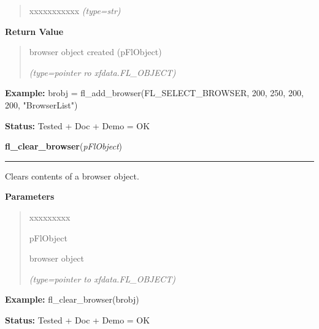 \begin{boxedminipage}{\funcwidth}
\begin{quote}
\begin{Ventry}{xxxxxxxxxxx}
            {\it (type=str)}

        \end{Ventry}

      \end{quote}

      \textbf{Return Value}
    \vspace{-1ex}

      \begin{quote}
      browser object created (pFlObject)

      {\it (type=pointer ro xfdata.FL\_OBJECT)}

      \end{quote}

\textbf{Example:} brobj = fl\_add\_browser(FL\_SELECT\_BROWSER, 200, 250, 200, 200,         
"BrowserList")



\textbf{Status:} Tested + Doc + Demo = OK



    \end{boxedminipage}

    \label{xformslib:flbrowser:fl_clear_browser}

    \vspace{0.5ex}

\hspace{.8\funcindent}\begin{boxedminipage}{\funcwidth}

    \raggedright \textbf{fl\_clear\_browser}(\textit{pFlObject})

    \vspace{-1.5ex}

    \rule{\textwidth}{0.5\fboxrule}
\setlength{\parskip}{2ex}
    Clears contents of a browser object.

\setlength{\parskip}{1ex}
      \textbf{Parameters}
      \vspace{-1ex}

      \begin{quote}
        \begin{Ventry}{xxxxxxxxx}

          \item[pFlObject]

          browser object

            {\it (type=pointer to xfdata.FL\_OBJECT)}

        \end{Ventry}

      \end{quote}

\textbf{Example:} fl\_clear\_browser(brobj)



\textbf{Status:} Tested + Doc + Demo = OK



    \end{boxedminipage}

